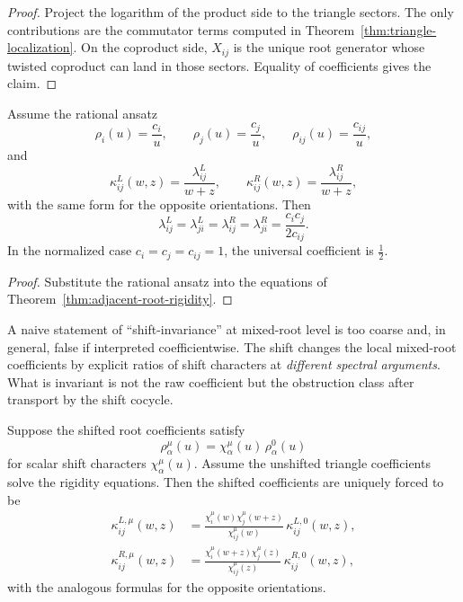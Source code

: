 \begin{proof}
Project the logarithm of the product side to the triangle sectors.
The only contributions are the commutator terms computed in
Theorem~\ref{thm:triangle-localization}.  On the coproduct side,
$X_{ij}$ is the unique root generator whose twisted coproduct can land in
those sectors.  Equality of coefficients gives the claim.
\end{proof}

\begin{corollary}
\ClaimStatusProvedHere
Assume the rational ansatz
\[
\rho_i(u)=\frac{c_i}{u},
\qquad
\rho_j(u)=\frac{c_j}{u},
\qquad
\rho_{ij}(u)=\frac{c_{ij}}{u},
\]
and
\[
\kappa_{ij}^{L}(w,z)=\frac{\lambda_{ij}^{L}}{w+z},
\qquad
\kappa_{ij}^{R}(w,z)=\frac{\lambda_{ij}^{R}}{w+z},
\]
with the same form for the opposite orientations.  Then
\[
\lambda_{ij}^{L}=
\lambda_{ji}^{L}=
\lambda_{ij}^{R}=
\lambda_{ji}^{R}=
\frac{c_ic_j}{2c_{ij}}.
\]
In the normalized case $c_i=c_j=c_{ij}=1$, the universal coefficient is
$\frac12$.
\end{corollary}

\begin{proof}
Substitute the rational ansatz into the equations of
Theorem~\ref{thm:adjacent-root-rigidity}.
\end{proof}

\begin{remark}
\label{rem:transport-not-invariance}
A naive statement of ``shift-invariance'' at mixed-root level is too
coarse and, in general, false if interpreted coefficientwise.  The shift
changes the local mixed-root coefficients by explicit ratios of shift
characters at \emph{different spectral arguments}.  What is invariant is
not the raw coefficient but the obstruction class after transport by the
shift cocycle.
\end{remark}

\begin{proposition}
\ClaimStatusProvedHere
\label{prop:triangle-shift-transport}
Suppose the shifted root coefficients satisfy
\[
\rho_\alpha^{\mu}(u)=\chi_\alpha^{\mu}(u)\,\rho_\alpha^{0}(u)
\]
for scalar shift characters $\chi_\alpha^{\mu}(u)$.
Assume the unshifted triangle coefficients solve the rigidity equations.
Then the shifted coefficients are uniquely forced to be
\begin{align*}
\kappa_{ij}^{L,\mu}(w,z)
&=
\frac{\chi_i^{\mu}(w)\chi_j^{\mu}(w+z)}{\chi_{ij}^{\mu}(w)}
\,\kappa_{ij}^{L,0}(w,z),\\
\kappa_{ij}^{R,\mu}(w,z)
&=
\frac{\chi_i^{\mu}(w+z)\chi_j^{\mu}(z)}{\chi_{ij}^{\mu}(z)}
\,\kappa_{ij}^{R,0}(w,z),
\end{align*}
with the analogous formulas for the opposite orientations.
\end{proposition}

